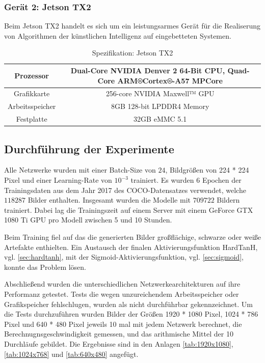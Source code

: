 \subsubsection{Gerät 2: Jetson TX2}

Beim Jetson TX2 handelt es sich um ein leistungsarmes Gerät für die Realiserung von Algorithmen der künstlichen Intelligenz auf eingebetteten Systemen.

\begin{table}[H]
    \centering
    \begin{tabular}{ |c|c| }
        \hline
        Prozessor       & Dual-Core NVIDIA Denver 2 64-Bit CPU, Quad-Core ARM®Cortex®-A57 MPCore \\ \hline
        Grafikkarte     & 256-core NVIDIA Maxwell™ GPU \\ \hline
        Arbeitsspeicher & 8GB 128-bit LPDDR4 Memory  \\ \hline
        Festplatte      & 32GB eMMC 5.1 \\ \hline
    \end{tabular}
    \caption{Spezifikation: Jetson TX2}
    \label{tab:jetson_tx1}
\end{table}

\subsection{Durchführung der Experimente}

Alle Netzwerke wurden mit einer Batch-Size von $ 24 $, Bildgrößen von 224 * 224 Pixel und einer Learning-Rate von $ 10^{-3} $ trainiert. Es wurden 6 Epochen der Trainingsdaten aus dem Jahr 2017 des COCO-Datensatzes verwendet, welche $ 118287 $ Bilder enthalten. Insgesamt wurden die Modelle mit $ 709722 $ Bildern trainiert. Dabei lag die Trainingszeit auf einem Server mit einem GeForce GTX 1080 Ti GPU pro Modell zwischen 5 und 10 Stunden.

Beim Training fiel auf das die generierten Bilder großflächige, schwarze oder weiße Artefakte enthielten. Ein Austausch der finalen Aktivierungsfunktion HardTanH, vgl. \ref{sec:hardtanh}, mit der Sigmoid-Aktivierungsfunktion, vgl. \ref{sec:sigmoid}, konnte das Problem lösen.

Abschließend wurden die unterschiedlichen Netzwerkearchitekturen auf ihre Performanz getestet. Tests die wegen unzureichendem Arbeitsspeicher oder Grafikspeicher fehlschlugen, wurden als \textcolor{danger}{nicht durchführbar} gekennzeichnet. Um die Tests durchzuführen wurden Bilder der Größen 1920 * 1080 Pixel, 1024 * 786 Pixel und 640 * 480 Pixel jeweils 10 mal mit jedem Netzwerk berechnet, die Berechnugnsgeschwindigkeit gemessen, und das arithmische Mittel der 10 Durchläufe gebildet. Die Ergebnisse sind in den Anlagen \ref{tab:1920x1080}, \ref{tab:1024x768} und \ref{tab:640x480} angefügt.

